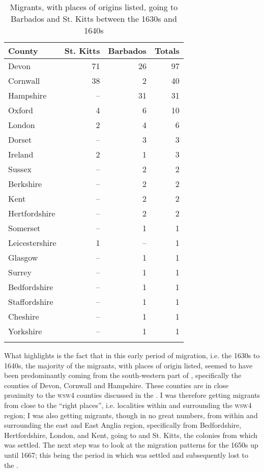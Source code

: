 \begin{table}
\begin{tabular}{lrrr}
\lsptoprule 
County & \multicolumn{1}{c}{St. Kitts} & \multicolumn{1}{c}{Barbados} & \multicolumn{1}{c}{Totals}\\
\midrule
Devon & 71 & 26 & 97 \\
Cornwall & 38 & 2 & 40 \\
Hampshire & -- & 31 & 31 \\
Oxford & 4 & 6 & 10 \\
London & 2 & 4 & 6 \\
Dorset & -- & 3 & 3 \\
Ireland & 2 & 1 & 3 \\
Sussex & -- & 2 & 2 \\
Berkshire & -- & 2 & 2 \\
Kent & -- & 2 & 2 \\
Hertfordshire & -- & 2 & 2 \\
Somerset & -- & 1 & 1 \\
Leicestershire & 1 & -- & 1 \\
Glasgow & -- & 1 & 1 \\
Surrey & -- & 1 & 1 \\
Bedfordshire & -- & 1 & 1 \\
Staffordshire & -- & 1 & 1 \\
Cheshire & -- & 1 & 1 \\
Yorkshire & -- & 1 & 1 \\
\lspbottomrule 
\end{tabular}
\caption{Migrants, with places of origins listed, going to Barbados and St. Kitts between the 1630s and 1640s}
\label{Table 6.2}
\end{table}

What  highlights is the fact that in this early period of migration, i.e. the 1630s to 1640s, the majority of the migrants, with places of origin listed, seemed to have been predominantly coming from the south-western part of , specifically the counties of Devon, Cornwall and Hampshire. These counties are in close proximity to the \textsc{wsw4} counties discussed in the . I was therefore getting migrants from close to the ``right places'', i.e. localities within and surrounding the \textsc{wsw4} region; I was also getting migrants, though in no great numbers, from within and surrounding the east and East Anglia  region, specifically from Bedfordshire, Hertfordshire, London, and Kent, going to  and St. Kitts, the colonies from which  was settled. The next step was to look at the migration patterns for the 1650s up until 1667; this being the period in which  was settled and subsequently lost to the .

